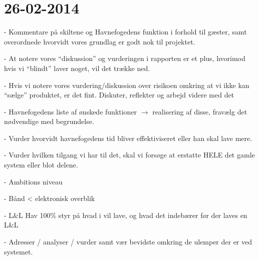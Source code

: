 \documentclass{article}
\begin{document}
\section{26-02-2014}
- Kommentare på skiltene og Havnefogedens funktion i forhold til gæster, samt overordnede hvorvidt vores grundlag er godt nok til projektet.

- At notere vores “diskussion” og vurderingen i rapporten er et plus, hvorimod hvis vi “blindt” laver noget, vil det trække ned.

- Hvis vi notere vores vurdering/diskussion over risikoen omkring at vi ikke kan “sælge” produktet, er det fint. Diskuter, reflekter og arbejd videre med det

- Havnefogedens liste af ønskede funktioner $\rightarrow$ realisering af disse, fravælg det nødvendige med begrundelse.

- Vurder hvorvidt havnefogedens tid bliver effektiviseret eller han skal lave mere.

- Vurder hvilken tilgang vi har til det, skal vi forsøge at erstatte HELE det gamle system eller blot delene.

- Ambitions niveau

- Bånd < elektronisk overblik

- L\&L Hav 100\% styr på hvad i vil lave, og hvad det indebærer før der laves en L\&L

- Adresser / analyser / vurder samt vær bevidste omkring de ulemper der er ved systemet.
\end{document}
